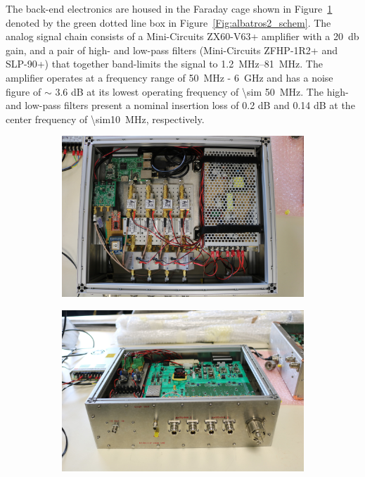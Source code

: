 The back-end electronics are housed in the Faraday cage shown in Figure~\ref{Fig:47093126504_fa0061a85b_o} denoted by the green dotted line box in Figure~\ref{Fig:albatros2_schem}. The analog signal chain consists of a Mini-Circuits ZX60-V63+ amplifier with a \SI{20}{\decibel} gain, and a pair of high- and low-pass filters (Mini-Circuits ZFHP-1R2+ and SLP-90+) that together band-limits the signal to \SIrange{1.2}{81}{\mega\hertz}. The amplifier operates at a frequency range of \SI{50}{\mega\hertz} - \SI{6}{\giga\hertz} and has a noise figure of $\sim$ 3.6 dB at its lowest operating frequency of \SI{\sim 50}{MHz}. The high- and low-pass filters present a nominal insertion loss of 0.2 dB and 0.14 dB at the center frequency of \SI{\sim10}{MHz}, respectively. 

\begin{figure}
	\centering
	\begin{subfigure}[t]{0.52\textwidth}
		\centering
		\includegraphics[width=\linewidth]{Figures/47093126504_fa0061a85b_o} 
		\caption{} \label{Fig:47093126504_fa0061a85b_o}
	\end{subfigure}
	\hfill
	\begin{subfigure}[t]{0.47\textwidth}
		\centering
		\includegraphics[width=\linewidth]{Figures/47093128324_04792aa5c5_o}

\end{subfigure}
\end{figure}
